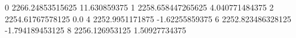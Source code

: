 0 2266.24853515625 11.630859375
1 2258.658447265625 4.040771484375
2 2254.61767578125 0.0
4 2252.9951171875 -1.62255859375
6 2252.823486328125 -1.794189453125
8 2256.126953125 1.50927734375
